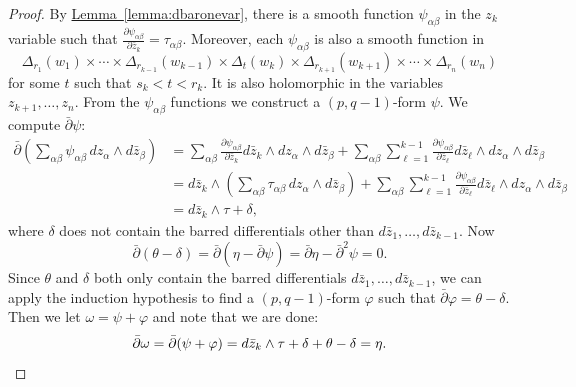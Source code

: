 \documentclass[12pt,openany]{book}
\theoremstyle{plain}
\theoremstyle{remark}
\theoremstyle{definition}
\theoremstyle{exercise}
\theoremstyle{example}
\newcommand{\lemmaref}[1]{\hyperref[#1]{Lemma~\ref*{#1}}}
\begin{document}
\begin{proof}
By \lemmaref{lemma:dbaronevar}, there is a smooth function
$\psi_{\alpha\beta}$ in the
$z_k$ variable such that $\frac{\partial \psi_{\alpha\beta}}{\partial \bar{z}_k} =
\tau_{\alpha \beta}$.  Moreover, each $\psi_{\alpha\beta}$ is also a smooth function
in
\begin{equation*}
\Delta_{r_1}(w_1)
\times \cdots \times
\Delta_{r_{k-1}}(w_{k-1})
\times
\Delta_{t}(w_{k})
\times
\Delta_{r_{k+1}}(w_{k+1})
\times \cdots \times
\Delta_{r_{n}}(w_{n})
\end{equation*}
for some $t$ such that $s_k < t < r_k$.
It is also holomorphic in the variables $z_{k+1},\ldots,z_n$.
From the $\psi_{\alpha\beta}$ functions we construct a $(p,q-1)$-form $\psi$.
We compute $\bar{\partial}\psi$:
\begin{equation*}
\begin{split}
\bar{\partial} \left(
\sum_{\alpha \beta}
\psi_{\alpha\beta} \, dz_\alpha \wedge d\bar{z}_\beta
\right)
& =
\sum_{\alpha \beta}
\frac{\partial \psi_{\alpha\beta}}{\partial \bar{z}_k} d\bar{z}_k
\wedge dz_\alpha \wedge d\bar{z}_\beta
+
\sum_{\alpha \beta}
\sum_{\ell=1}^{k-1}
\frac{\partial \psi_{\alpha\beta}}{\partial \bar{z}_\ell} d\bar{z}_\ell
\wedge dz_\alpha \wedge d\bar{z}_\beta
\\
& =
d\bar{z}_k
\wedge
\left(
\sum_{\alpha \beta}
\tau_{\alpha\beta}
\,
dz_\alpha \wedge d\bar{z}_\beta
\right)
+
\sum_{\alpha \beta}
\sum_{\ell=1}^{k-1}
\frac{\partial \psi_{\alpha\beta}}{\partial \bar{z}_\ell} d\bar{z}_\ell
\wedge dz_\alpha \wedge d\bar{z}_\beta
\\
& =
d\bar{z}_k \wedge \tau + \delta ,
\end{split}
\end{equation*}
where $\delta$ does not contain
the barred differentials other than $d\bar{z}_1,\ldots,d\bar{z}_{k-1}$.
Now
\begin{equation*}
\bar{\partial}(\theta-\delta)
=
\bar{\partial}(\eta-\bar{\partial} \psi)
=
\bar{\partial}\eta-\bar{\partial}^2 \psi = 0 .
\end{equation*}
Since $\theta$ and $\delta$ both only contain the barred differentials
$d\bar{z}_1,\ldots,d\bar{z}_{k-1}$, we can apply the
induction hypothesis to find a $(p,q-1)$-form $\varphi$ such that
$\bar{\partial} \varphi = \theta-\delta$.  Then we let
$\omega = \psi+\varphi$ and note that we are done:
\begin{equation*}
\bar{\partial} \omega
=
\bar{\partial} (\psi+\varphi )
=
d\bar{z}_k \wedge \tau + \delta + \theta - \delta
=
\eta .
\qedhere
\end{equation*}
\end{proof}
\end{document}
